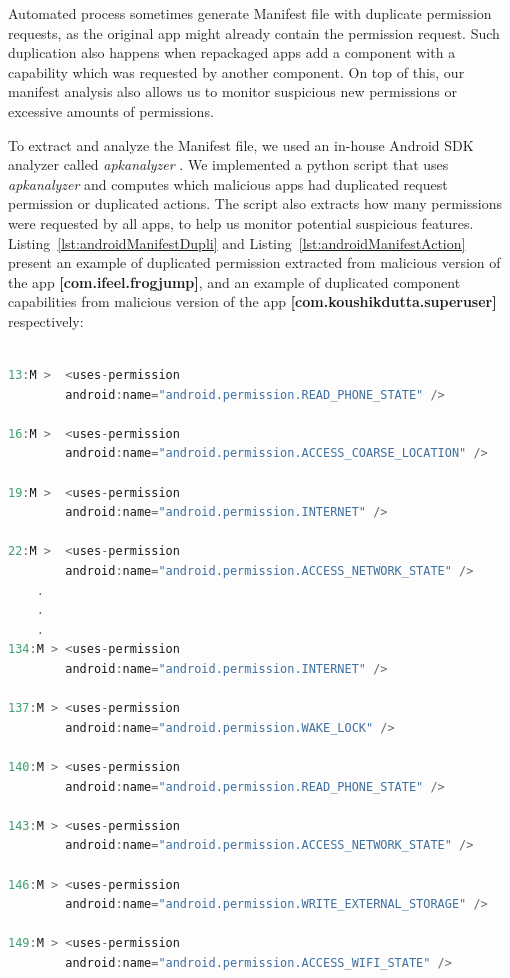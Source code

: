 Automated process sometimes generate Manifest file with duplicate permission requests, as the original app might already contain the permission request. Such duplication also happens when repackaged apps add a component with a capability which was requested by another component. On top of this, our manifest analysis also allows us to monitor suspicious new permissions or excessive amounts of permissions. 

To extract and analyze the Manifest file, we used an in-house Android SDK analyzer called \textit{apkanalyzer} . We implemented a python script that uses \textit{apkanalyzer} and computes which malicious apps had duplicated request permission or duplicated actions. The script also extracts how many permissions were requested by all apps, to help us monitor potential suspicious features. Listing~\ref{lst:androidManifestDupli} and Listing~\ref{lst:androidManifestAction} present an example of duplicated permission extracted from malicious version of the app \textbf{[com.ifeel.frogjump]}, and an example of duplicated component capabilities from malicious version of the app \textbf{[com.koushikdutta.superuser]} respectively:


\begin{lstlisting}[caption={Example of duplicated permission from malicious version of app (com.ifeel.frogjump)}, language=Java,
    basicstyle=\fontsize{6}{5}\selectfont\ttfamily,
    label={lst:androidManifestDupli}]

13:M >  <uses-permission
        android:name="android.permission.READ_PHONE_STATE" />

16:M >  <uses-permission
        android:name="android.permission.ACCESS_COARSE_LOCATION" />

19:M >  <uses-permission
        android:name="android.permission.INTERNET" />

22:M >  <uses-permission
        android:name="android.permission.ACCESS_NETWORK_STATE" />
    .
    .
    .
134:M > <uses-permission
        android:name="android.permission.INTERNET" />

137:M > <uses-permission
        android:name="android.permission.WAKE_LOCK" />

140:M > <uses-permission
        android:name="android.permission.READ_PHONE_STATE" />

143:M > <uses-permission
        android:name="android.permission.ACCESS_NETWORK_STATE" />

146:M > <uses-permission
        android:name="android.permission.WRITE_EXTERNAL_STORAGE" />

149:M > <uses-permission
        android:name="android.permission.ACCESS_WIFI_STATE" />
\end{lstlisting}

